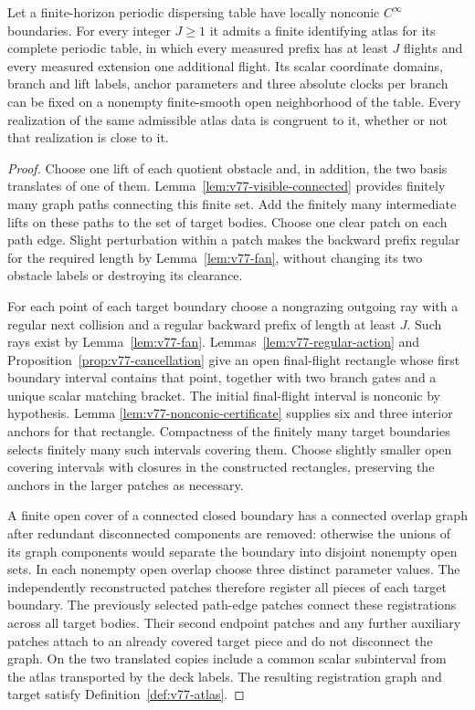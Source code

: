 \begin{theorem}
\label{thm:v77-finite-atlas}
Let a finite-horizon periodic dispersing table have locally nonconic
$C^\infty$ boundaries.  For every integer $J\ge1$ it admits a finite
identifying atlas for its complete periodic table, in which every
measured prefix has at least $J$ flights and every measured extension
one additional flight.  Its scalar coordinate domains, branch and lift
labels, anchor parameters and three absolute clocks per branch can be
fixed on a nonempty finite-smooth open neighborhood of the table.
Every realization of the same admissible atlas data is congruent to
it, whether or not that realization is close to it.
\end{theorem}
\begin{proof}
Choose one lift of each quotient obstacle and, in addition, the two
basis translates of one of them.  Lemma~\ref{lem:v77-visible-connected}
provides finitely many graph paths connecting this finite set.  Add the
finitely many intermediate lifts on these paths to the set of target
bodies.  Choose one clear patch on each path edge.  Slight perturbation
within a patch makes the backward prefix regular for the required
length by Lemma~\ref{lem:v77-fan}, without changing its two obstacle
labels or destroying its clearance.

For each point of each target boundary choose a nongrazing outgoing
ray with a regular next collision and a regular backward prefix of
length at least $J$.  Such rays exist by Lemma~\ref{lem:v77-fan}.
Lemmas~\ref{lem:v77-regular-action} and
Proposition~\ref{prop:v77-cancellation} give an open final-flight
rectangle whose first boundary interval contains that point, together
with two branch gates and a unique scalar matching bracket.  The
initial final-flight interval is nonconic by hypothesis.  Lemma
\ref{lem:v77-nonconic-certificate} supplies six and three interior
anchors for that rectangle.  Compactness of the finitely many target
boundaries selects finitely many such intervals covering them.  Choose
slightly smaller open covering intervals with closures in the constructed
rectangles, preserving the anchors in the larger patches as necessary.

A finite open cover of a connected closed boundary has a connected
overlap graph after redundant disconnected components are removed:
otherwise the unions of its graph components would separate the
boundary into disjoint nonempty open sets.  In each nonempty open
overlap choose three distinct parameter values.  The independently
reconstructed patches therefore register all pieces of each target
boundary.  The previously selected path-edge patches connect these
registrations across all target bodies.  Their second endpoint patches
and any further auxiliary patches attach to an already covered target
piece and do not disconnect the graph.  On the two translated copies
include a common scalar subinterval from the atlas transported by the
deck labels.  The resulting registration graph and target satisfy
Definition~\ref{def:v77-atlas}.


\end{proof}
